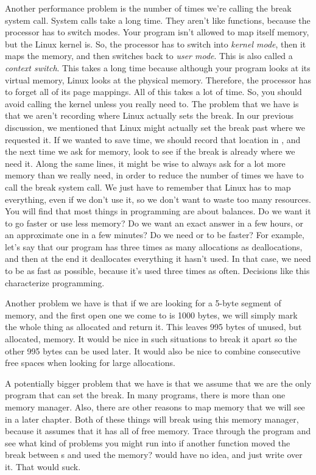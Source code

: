 Another performance problem is the number of times we're calling the break system call.
System calls take a long time.  They aren't like functions, because the processor has
to switch modes.  Your program isn't allowed to map itself memory, but the Linux kernel is.  
So, the processor has to switch into \emph{kernel mode}, then it maps the
memory, and then switches back to \emph{user mode}.  This is also called
a \emph{context switch}.  This takes a long time because although your
program looks at its virtual memory, Linux looks at the physical memory.  Therefore,
the processor has to forget all of its page mappings.  All of this takes a lot of time.
So, you should avoid calling the kernel unless you really need to.  The problem that we
have is that we aren't recording where Linux actually sets the break.  In our previous
discussion, we mentioned that Linux might actually set the break past where we requested
it.  If we wanted to save time, we should record that location in ,
and the next time we ask for memory, look to see if the break is already where we need it.
Along the same lines, it might be wise to always ask for a lot more memory than we really
need, in order to reduce the number of times we have to call the break system call.  We
just have to remember that Linux has to map everything, even if we don't use it, so we
don't want to waste too many resources.  You will find that most things in programming
are about balances.  Do we want it to go faster or use less memory?  Do we want an exact
answer in a few hours, or an approximate one in a few minutes?  Do we need 
 or  to be faster?  For example,
let's say that our program has three times as many allocations as deallocations, and 
then at the end it deallocates everything it hasn't used.  In that case, we need 
 to be as fast as possible, because it's used three times
as often.  Decisions like this characterize programming.

Another problem we have is that if we are looking for a 5-byte segment of memory, and
the first open one we come to is 1000 bytes, we will simply mark the whole thing
as allocated and return it.  This leaves 995 bytes of unused, but allocated, memory.
It would be nice in such situations to break it apart so the other 995 bytes can be
used later.  It would also be nice to combine consecutive free spaces when looking
for large allocations.

A potentially bigger problem that we have is that we assume that we are the only
program that can set the break.  In many programs, there is more than one memory
manager.  Also, there are other reasons to map memory that we will see in a later
chapter.%
  Both of these things will break using this memory manager, because it
assumes that it has all of free memory.  Trace through the program and see what kind
of problems you might run into if another function moved the break between 
s and used the memory?   would
have no idea, and just write over it.  That would suck.

